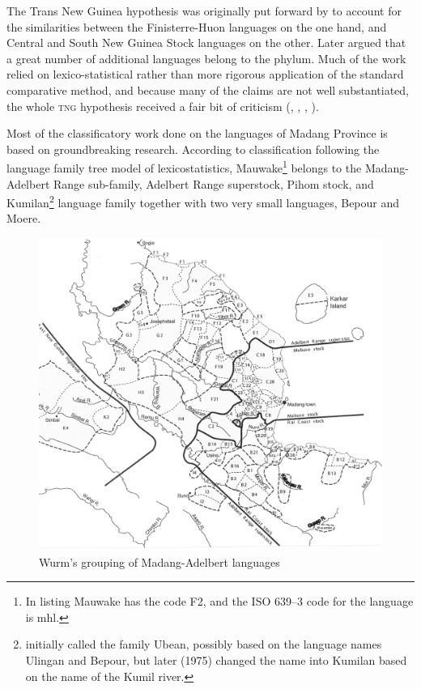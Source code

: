The Trans New Guinea hypothesis was originally put forward by \citet{McElhanonEtAL1970} to account for the similarities between the Finisterre-Huon languages on the one hand, and Central and South New Guinea Stock languages on the other. Later \citet{Wurm1975} argued that a great number of additional languages belong to the phylum.  Much of the work relied on lexico-statistical rather than more rigorous application of the standard comparative method, and because many of the claims are not well substantiated, the whole \textsc{tng} hypothesis received a fair bit of criticism (\citealt{Lang1976}, \citealt{Haiman1979}, \citealt{Foley1986}, \citealt{Pawley1995}).

Most of the classificatory work done on the languages of Madang Province is based on \citet{ZGraggen1971,ZGraggen1975} groundbreaking research.  According to  classification following the language family tree model of lexicostatistics, Mauwake\footnote{In  listing Mauwake has the code F2, and the ISO 639--3 code for the language is mhl.} belongs to the Madang-Adelbert Range sub-family, Adelbert Range superstock, Pihom stock, and Kumilan\footnote{\citet{ZGraggen1971} initially called the family Ubean, possibly based on the language names Ulingan and Bepour, but later (1975) changed the name into Kumilan based on the name of the Kumil river.} language family together with two very small languages, Bepour and Moere. 




\begin{figure}
\caption{Wurm's grouping of Madang-Adelbert languages \citep [Map~3]{Ross1996}}
\label{map:3:MadangWurm}
\includegraphics[width=\textwidth]{figures/1-wurms_grouping_of_madang_adelbert_languages.jpeg}
\end{figure}

